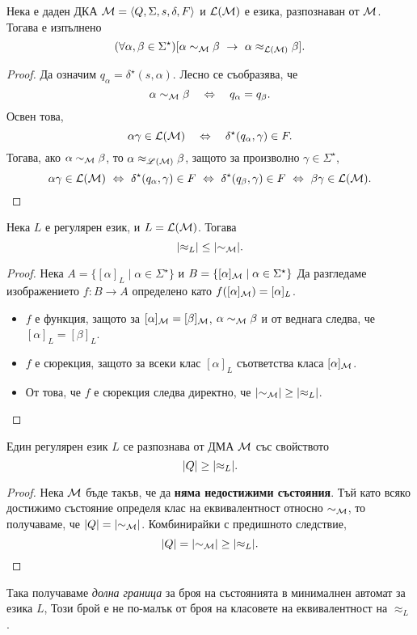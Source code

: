 \begin{thm}
  \label{th:rel-finer}
  Нека е даден ДКА $\mathcal{M} = \langle{Q,\Sigma,s,\delta,F}\rangle$ и $\mathcal{L}(\mathcal{M})$ е езика, разпознаван от $\mathcal{M}$. Тогава е изпълнено
  \[(\forall \alpha,\beta \in \Sigma^\star)[\alpha\sim_\M\beta\ \rightarrow\ \alpha\approx_{\L(\M)}\beta].\]
\end{thm}
\begin{proof}
  Да означим $q_\alpha = \delta^\star(s, \alpha)$.
  Лесно се съобразява, че 
  \[\alpha \sim_{\mathcal{M}} \beta\quad\Leftrightarrow\quad q_\alpha = q_\beta.\]
  Освен това, 
  \[\alpha\gamma \in \mathcal{L}(\mathcal{M})\quad \Leftrightarrow\quad \delta^\star(q_\alpha, \gamma) \in F.\]
  Тогава, ако $\alpha \sim_{\mathcal{M}} \beta$, то  $\alpha \approx_{\mathscr{L}(\mathcal{M})}\beta$, защото за произволно $\gamma \in \Sigma^\star$,
  \[\alpha\gamma \in \L(\M)\ \Leftrightarrow\ \delta^\star(q_\alpha,\gamma) \in F\ \Leftrightarrow\ \delta^\star(q_\beta, \gamma)\in F\ \Leftrightarrow\ \beta\gamma \in \L(\M).\]  
\end{proof}

\begin{cor}
  Нека $L$ е регулярен език, и $L = \mathcal{L}(\mathcal{M})$.
  Тогава 
  \[\lvert{\approx_L}\rvert \leq \lvert{\sim_{\mathcal{M}}}\rvert.\]
\end{cor}
\begin{proof}
  Нека $A = \{[\alpha]_L \mid \alpha\in\Sigma^\star\}$ и $B = \{[\alpha]_{\mathcal{M}} \mid \alpha\in\Sigma^\star\}$
  Да разгледаме изображението $f:B\to A$ определено като $f([\alpha]_{\mathcal{M}}) = [\alpha]_L$.
  \begin{itemize}
  \item 
    $f$ е функция, защото за $[\alpha]_{\mathcal{M}} = [\beta]_{\mathcal{M}}$, 
    $\alpha \sim_{\mathcal{M}} \beta$ и от  веднага следва, че $[\alpha]_L = [\beta]_L$.
  \item
    $f$ е сюрекция, защото за всеки клас $[\alpha]_L$ съответства класа $[\alpha]_{\mathcal{M}}$.
  \item
    От това, че $f$ е сюрекция следва директно, че $\lvert{\sim_{\mathcal{M}}}\rvert \geq \lvert{\approx_L}\rvert$.
  \end{itemize}
\end{proof}

\begin{cor}
  Един регулярен език $L$ се разпознава от ДМА $\mathcal{M}$ със свойството
  \[\lvert{Q}\rvert \geq \lvert{\approx_L}\rvert.\]
\end{cor}
\begin{proof}
  Нека $\mathcal{M}$ бъде такъв, че да {\bf няма недостижими състояния}.
  Тъй като всяко достижимо състояние определя клас на еквивалентност относно $\sim_{\mathcal{M}}$,
  то получаваме, че $\lvert{Q}\rvert = \lvert{\sim_{\mathcal{M}}}\rvert$.
  Комбинирайки с предишното следствие, 
  \[\lvert{Q}\rvert = \lvert{\sim_{\mathcal{M}}}\rvert \geq \lvert{\approx_L}\rvert.\]
\end{proof}
Така получаваме {\em долна граница} за броя на състоянията в минималнен автомат за езика $L$,
Този брой е не по-малък от броя на класовете на еквивалентност на $\approx_L$.

